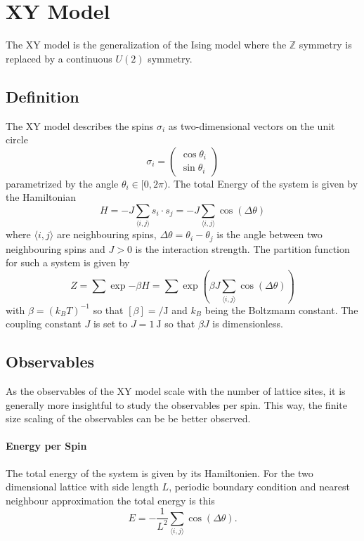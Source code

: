 \section{XY Model}
	The XY model is the generalization of the Ising model where the $\mathbb{Z}$ symmetry is replaced by a continuous $U(2)$ symmetry.
	
	\subsection{Definition}
		The XY model describes the spins $\sigma_i$ as two-dimensional vectors on the unit circle
		\begin{equation}\label{eq:hamiltonian}
			\sigma_i = \begin{pmatrix}
				\cos{\theta_i} \\ \sin{\theta_i}
			\end{pmatrix}
		\end{equation}
		parametrized by the angle $\theta_i \in [0,2\pi)$. The total Energy of the system is given by the Hamiltonian
		\begin{equation}
			H = -J \sum_{\langle i, j \rangle}{s_i \cdot s_j} = -J \sum_{\langle i, j \rangle}{\cos(\Delta \theta)}
		\end{equation}
		where $\langle i,j \rangle$ are neighbouring spins, $\Delta \theta = \theta_i - \theta_j$ is the angle between two neighbouring spins and $J>0$ is the interaction strength. The partition function for such a system is given by
		\begin{equation}
			Z = \sum{\exp{-\beta H}} = \sum{\exp{ \left( \beta J \sum_{\langle i, j \rangle}{\cos(\Delta \theta)} \right) }}
		\end{equation}
		with $\beta = (k_B T)^{-1}$ so that $[\beta] = \si{\per\joule}$ and $k_B$ being the Boltzmann constant. The coupling constant $J$ is set to $J = \SI{1}{\joule}$ so that $\beta J$ is dimensionless. 
		
	\subsection{Observables}
		As the observables of the XY model scale with the number of lattice sites, it is generally more insightful to study the observables per spin. This way, the finite size scaling of the observables can be be better observed.
	
		\paragraph{Energy per Spin}
			The total energy of the system is given by its Hamiltonien. For the two dimensional lattice with side length $L$, periodic boundary condition and nearest neighbour approximation the total energy is this
			\begin{equation}
				E = - \frac{1}{L^2} \sum_{\langle i, j \rangle}{\cos(\Delta \theta)}.
			\end{equation}
		
